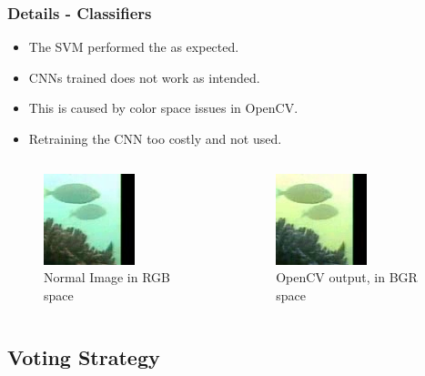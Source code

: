 \documentclass{beamer}[fullspacing]
\begin{document}
\begin{frame}
\frametitle{Details - Classifiers}

\begin{itemize}
\item
The SVM performed the as expected.
\item
CNNs trained does not work as intended.
\item
This is caused by color space issues in OpenCV. 
\item
Retraining the CNN too costly and not used.
\end{itemize}

\begin{columns}
\setlength{\abovecaptionskip}{-2pt}
\begin{figure}
\includegraphics[scale=0.6]{image/outfile.jpg}
\caption{Normal Image in RGB space}
\end{figure}

\begin{figure}
\includegraphics[scale=0.6]{image/outfile2.jpg}
\caption{OpenCV output, in BGR space}
\end{figure}
\end{columns}

\end{frame}



\subsection{Voting Strategy}
\end{document}
